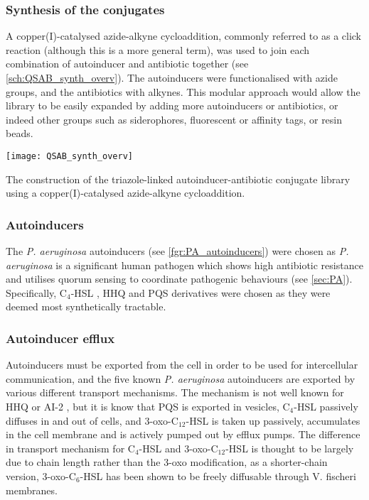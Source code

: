 \subsubsection{Synthesis of the conjugates}

A copper(I)-catalysed azide-alkyne cycloaddition\cite{Tornoe2002,ANIE:ANIE2596}, commonly referred to as a click reaction (although this is a more general term), was used to join each combination of autoinducer and antibiotic together (see \ref{sch:QSAB_synth_overv}). 
The autoinducers were functionalised with azide groups, and the antibiotics with alkynes.
This modular approach would allow the library to be easily expanded by adding more autoinducers or antibiotics, or indeed other groups such as siderophores, fluorescent or affinity tags, or resin beads. 

\begin{scheme}[H]
	\begin{center}
		\texttt{[image: QSAB\_synth\_overv]}
		\caption{The construction of the triazole-linked autoinducer-antibiotic conjugate library using a copper(I)-catalysed azide-alkyne cycloaddition. \label{sch:QSAB_synth_overv}}
	\end{center}
\end{scheme}

\subsubsection{Autoinducers}

The \textit{P. aeruginosa} autoinducers (see \ref{fgr:PA_autoinducers}) were chosen as \textit{P. aeruginosa} is a significant human pathogen which shows high antibiotic resistance and utilises quorum sensing to coordinate pathogenic behaviours (see \ref{sec:PA}). 
Specifically, C$_4$-HSL , HHQ  and PQS  derivatives were chosen as they were deemed most synthetically tractable.

\subsubsection{Autoinducer efflux\label{sec:AI_eff}}

Autoinducers must be exported from the cell in order to be used for intercellular communication, and the five known \textit{P. aeruginosa} autoinducers are exported by various different transport mechanisms.
The mechanism is not well known for HHQ  or AI-2 , but it is know that
PQS  is exported in vesicles\cite{Florez2017},
C$_4$-HSL  passively diffuses in and out of cells\cite{Pearson1999}, and
3-oxo-C$_{12}$-HSL  is taken up passively, accumulates in the cell membrane and is actively pumped out by efflux pumps.
The difference in transport mechanism for C$_4$-HSL  and 3-oxo-C$_{12}$-HSL  is thought to be largely due to chain length rather than the 3-oxo modification, as a shorter-chain version, 3-oxo-C$_6$-HSL  has been shown to be freely diffusable through V. fischeri membranes\cite{Kaplan1985}.

